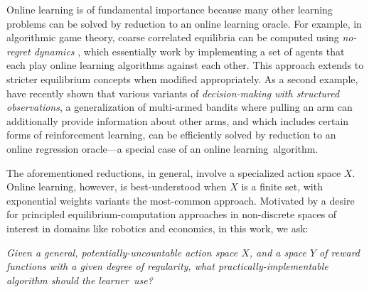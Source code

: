 \documentclass[preprint,12pt]{colt2025}
\newenvironment{customleftbar}{\def\FrameCommand{{\color{gray}\vrule width 3pt}\hspace{\parindent-3pt}}\MakeFramed{\advance\hsize-\width \FrameRestore}\setlength{\parindent}{0pt}\slshape}{\endMakeFramed}
\begin{document}
Online learning is of fundamental importance because many other learning problems can be solved by reduction to an online learning oracle.
For example, in algorithmic game theory, coarse correlated equilibria can be computed using \emph{no-regret dynamics} \cite{roughgarden16}, which essentially work by implementing a set of agents that each play online learning algorithms against each other.
This approach extends to stricter equilibrium concepts when modified appropriately.
As a second example, \textcite{foster21,foster22,foster23} have recently shown that various variants of \emph{decision-making with structured observations}, a generalization of multi-armed bandits where pulling an arm can additionally provide information about other arms, and which includes certain forms of reinforcement learning, can be efficiently solved by reduction to an online regression oracle---a special case of an online learning~algorithm.

The aforementioned reductions, in general, involve a specialized action space $X$.
Online learning, however, is best-understood when $X$ is a finite set, with exponential weights variants the most-common approach.
Motivated by a desire for principled equilibrium-computation approaches in non-discrete spaces of interest in domains like robotics and economics, in this work, we ask:

\begin{customleftbar}
Given a general, potentially-uncountable action space $X$, and a space $Y$ of reward functions with a given degree of regularity, what practically-implementable algorithm should the learner~use?
\end{customleftbar}
\end{document}
